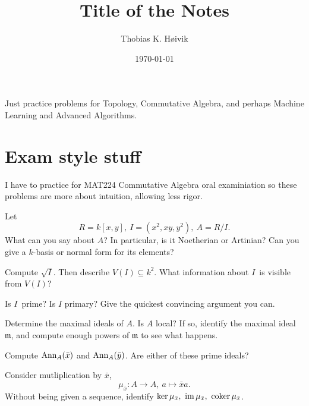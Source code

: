 \documentclass[11pt]{article}
\title{Title of the Notes}
\author{Thobias K. H\o ivik}
\date{\today} %
\begin{document}
\maketitle

Just practice problems for Topology, Commutative Algebra, 
and perhaps Machine Learning and Advanced Algorithms.

\section{Exam style stuff}
I have to practice for MAT224 Commutative Algebra 
oral examiniation so these problems are more 
about intuition, allowing less rigor. 

\begin{prob}
    Let 
    \[
        R = k[x,y] , \ I = (x^2, xy, y^2), \ A = R/I. 
    \]
    What can you say about $A$? 
    In particular, is it Noetherian or Artinian? 
    Can you give a $k$-basis or normal form for its elements?

    Compute $\sqrt I$. Then describe $V(I) \subseteq k^2$. 
    What information about $I$ is visible from $V(I)$? 

    Is $I$ prime? Is $I$ primary? Give the 
    quickest convincing argument you can. 

    Determine the maximal ideals of $A$. 
    Is $A$ local? 
    If so, identify the maximal ideal 
    $\mathfrak m$, and compute enough powers of 
    $\mathfrak m$ to see what happens. 

    Compute $\operatorname{Ann}_A(\bar x)$ and 
    $\operatorname{Ann}_A(\bar y)$. 
    Are either of these prime ideals? 

    Consider mutliplication by $\bar x$, 
    \[
        \mu_{\bar x} : A \to A, \ a \mapsto \bar x a. 
    \]
    Without being given a sequence, identify 
    $\ker \mu_{\bar x},  \ \operatorname{im} \mu_{\bar x}, \ \operatorname{coker} 
    \mu_{\bar x}$. 

\end{prob}
\end{document}
